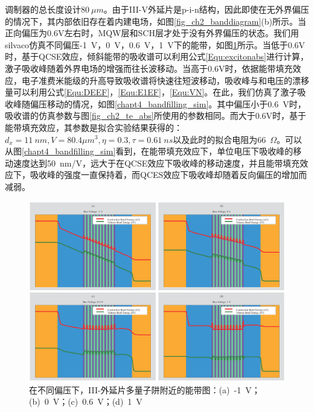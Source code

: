调制器的总长度设计$80~\mu m$。由于III-V外延片是p-i-n结构，因此即使在无外界偏压的情况下，其内部依旧存在着内建电场，如图\ref{fig_ch2_banddiagram}(b)所示。当正向偏压为0.6V左右时，MQW层和SCH层才处于没有外界偏压的状态。我们用silvaco\cite{Silvaco}仿真不同偏压-1~V，0~V，0.6~V，1~V下的能带，如图\ref{chapt4_band_diagram}所示。当低于0.6V时，基于QCSE效应，倾斜能带的吸收谱可以利用公式\ref{Equ:excitonabs}进行计算，激子吸收峰随着外界电场的增强而往长波移动。当高于0.6V时，依据能带填充效应，电子准费米能级的升高导致吸收谱将快速往短波移动，吸收峰与和电压的漂移量可以利用公式\ref{Equ:DEEF}，\ref{Equ:E1EF}，\ref{Equ:VN}。在此，我们仿真了激子吸收峰随偏压移动的情况，如图\ref{chapt4_bandfilling_sim}。其中偏压小于0.6~V时，吸收谱的仿真参数与图\ref{fig_ch2_te_abs}所使用的参数相同。而大于0.6V时，基于能带填充效应，其参数是拟合实验结果获得的：$d_x = 11~nm, V = 80.4 \mu m^3, \eta = 0.3, \tau = 0.61~ns$以及此时的拟合电阻为66~$\Omega$。可以从图\ref{chapt4_bandfilling_sim}看到，在能带填充效应下，单位电压下吸收峰的移动速度达到50~nm/V，远大于在QCSE效应下吸收峰的移动速度，并且能带填充效应下，吸收峰的强度一直保持着，而QCES效应下吸收峰却随着反向偏压的增加而减弱。
\begin{figure}[htb]
	\centering
	\includegraphics[width=14cm]{./Pictures/chapt4_band_diagram.eps}
	\caption{在不同偏压下，III-外延片多量子阱附近的能带图：(a)~-1~V；(b)~0~V；(c)~0.6~V；(d)~1~V}
	\label{chapt4_band_diagram}
\end{figure}
